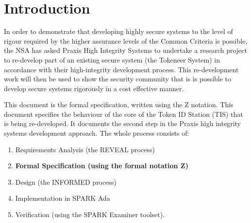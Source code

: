 
\chapter{Introduction}
In order to demonstrate that developing highly secure systems to the
level of rigour required by the higher assurance levels of the Common
Criteria is possible, the NSA has asked Praxis High Integrity Systems to
undertake a research project to re-develop part of an existing secure
system (the Tokeneer System) in accordance with their high-integrity
development process. This re-development work will then be used to
show the security community that is is possible to develop secure
systems rigorously in a cost effective manner.

This document is the formal specification, written using the Z
notation. This document specifies the behaviour of the core of the Token
ID Station (TIS) that is being re-developed.
It documents the second step in the Praxis high
integrity systems development approach. The whole process consists of:

\begin{enumerate}
\item
Requirements Analysis (the REVEAL process)
\item
{\bf Formal Specification (using the formal notation Z)}
\item
Design (the INFORMED process)
\item
Implementation in SPARK Ada
\item
Verification (using the SPARK Examiner toolset).
\end{enumerate}

